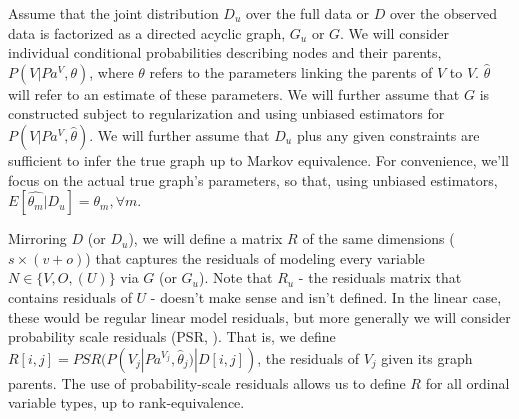 \documentclass[letterpaper]{article}
\begin{document}
\begin{table}[h]
\centering
{}
\caption{Notation}
\label{tab:notation}
\end{table}

Assume that the joint distribution $D_{u}$ over the full data or $D$ over the observed data is factorized as a directed acyclic graph, $G_{u}$ or $G$.  We will consider individual conditional probabilities describing nodes and their parents, $P(V | Pa^{V}, \theta)$, where $\theta$ refers to the parameters linking  the parents of $V$ to $V$.  $\hat{\theta}$ will refer to an estimate of these parameters.  We will further assume that $G$ is constructed subject to regularization and using unbiased estimators for $P(V | Pa^{V}, \hat{\theta})$.  We will further assume that $D_u$ plus any given constraints are sufficient to infer the true graph up to Markov equivalence.  For convenience, we'll focus on the actual true graph's parameters, so that, using unbiased estimators, $E[\hat{\theta_m}|D_u] = \theta_m, \forall m$.

Mirroring $D$ (or $D_u$), we will define a matrix $R$ of the same dimensions ($s \times (v + o)$) that captures the residuals of modeling every variable $N \in \{V, O, (U)\}$ via $G$ (or $G_u$).  Note that $R_u$ - the residuals matrix that contains residuals of $U$ - doesn't make sense and isn't defined.  In the linear case, these would be regular linear model residuals, but more generally we will consider probability scale residuals (PSR, \cite{shepherd_probability-scale_2016}).  That is, we define $R[i, j] = PSR(P(V_j | Pa^{V_j}, \hat{\theta}_j) | D[i, j])$, the residuals of $V_j$ given its graph parents.  The use of probability-scale residuals allows us to define $R$ for all ordinal variable types, up to rank-equivalence.
\end{document}
